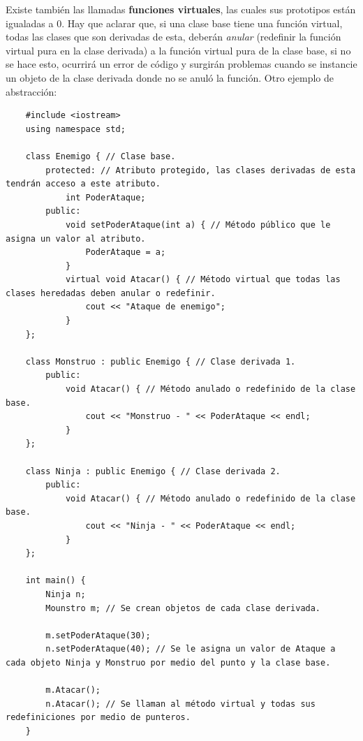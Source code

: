 Existe también las llamadas \textbf{funciones virtuales}, las cuales sus prototipos están igualadas a 0. Hay que aclarar que, si una clase base tiene una función virtual, todas las clases que son derivadas de esta, deberán \textit{anular} (redefinir la función virtual pura en la clase derivada) a la función virtual pura de la clase base, si no se hace esto, ocurrirá un error de código y surgirán problemas cuando se instancie un objeto de la clase derivada donde no se anuló la función. Otro ejemplo de abstracción:
\begin{lstlisting}
    #include <iostream>
    using namespace std;
    
    class Enemigo { // Clase base.
        protected: // Atributo protegido, las clases derivadas de esta tendrán acceso a este atributo.
            int PoderAtaque;
        public:
            void setPoderAtaque(int a) { // Método público que le asigna un valor al atributo.
                PoderAtaque = a;
            }
            virtual void Atacar() { // Método virtual que todas las clases heredadas deben anular o redefinir.
                cout << "Ataque de enemigo";
            }
    };
    
    class Monstruo : public Enemigo { // Clase derivada 1.
        public:
            void Atacar() { // Método anulado o redefinido de la clase base.
                cout << "Monstruo - " << PoderAtaque << endl;
            }
    };
    
    class Ninja : public Enemigo { // Clase derivada 2.
        public:
            void Atacar() { // Método anulado o redefinido de la clase base.
                cout << "Ninja - " << PoderAtaque << endl;
            }
    };
    
    int main() {
        Ninja n;
        Mounstro m; // Se crean objetos de cada clase derivada.
        
        m.setPoderAtaque(30);
        n.setPoderAtaque(40); // Se le asigna un valor de Ataque a cada objeto Ninja y Monstruo por medio del punto y la clase base.
        
        m.Atacar();
        n.Atacar(); // Se llaman al método virtual y todas sus redefiniciones por medio de punteros.
    }
\end{lstlisting}